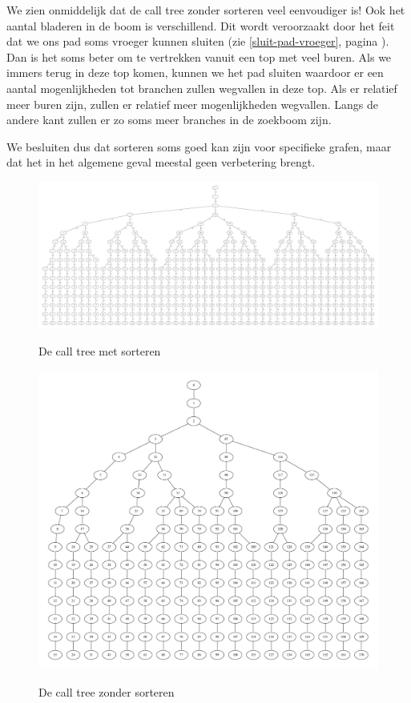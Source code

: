\documentclass{article}
\begin{document}
We zien onmiddelijk dat de call tree zonder sorteren veel eenvoudiger is!
Ook het aantal bladeren in de boom is verschillend. Dit wordt veroorzaakt
door het feit dat we ons pad soms vroeger kunnen sluiten (zie
\ref{sluit-pad-vroeger}, pagina \pageref{sluit-pad-vroeger}). Dan is het
soms beter om te vertrekken vanuit een top met veel buren. Als we immers
terug in deze top komen, kunnen we het pad sluiten waardoor er een aantal
mogenlijkheden tot branchen zullen wegvallen in deze top. Als er relatief
meer buren zijn, zullen er relatief meer mogenlijkheden wegvallen. Langs de
andere kant zullen er zo soms meer branches in de zoekboom zijn.
\newline

We besluiten dus dat sorteren soms goed kan zijn voor specifieke grafen,
maar dat het in het algemene geval meestal geen verbetering brengt.

\begin{figure}
\begin{center}
\includegraphics[width=\textwidth]{images/sorted-call-tree.pdf}
\caption{De call tree met sorteren}
\label{fig:sorted-call-tree}
\includegraphics[width=\textwidth]{images/default-call-tree.pdf}
\caption{De call tree zonder sorteren}
\label{fig:default-call-tree}
\end{center}
\end{figure}
\end{document}
